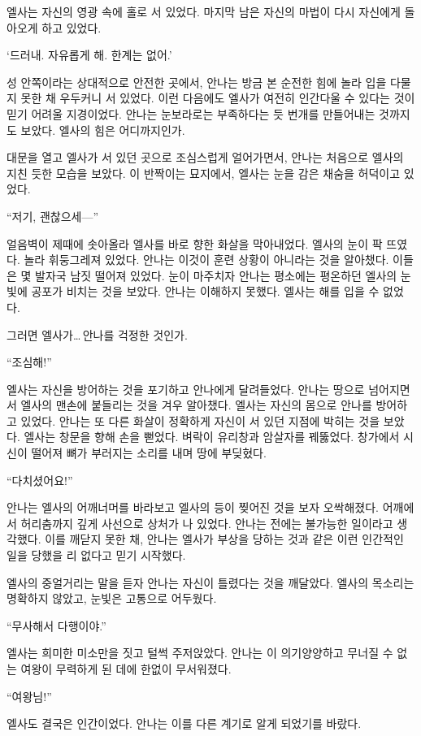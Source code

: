 엘사는 자신의 영광 속에 홀로 서 있었다. 마지막 남은 자신의 마법이 다시 자신에게 돌아오게 하고 있었다.

`드러내. 자유롭게 해. 한계는 없어.'

\textbreak

성 안쪽이라는 상대적으로 안전한 곳에서, 안나는 방금 본 순전한 힘에 놀라 입을 다물지 못한 채 우두커니 서 있었다. 이런 다음에도 엘사가 여전히 인간다울 수 있다는 것이 믿기 어려울 지경이었다. 안나는 눈보라로는 부족하다는 듯 번개를 만들어내는 것까지도 보았다. 엘사의 힘은 어디까지인가.

대문을 열고 엘사가 서 있던 곳으로 조심스럽게 얼어가면서, 안나는 처음으로 엘사의 지친 듯한 모습을 보았다. 이 반짝이는 묘지에서, 엘사는 눈을 감은 채숨을 허덕이고 있었다.

``저기, 괜찮으세—''

얼음벽이 제때에 솟아올라 엘사를 바로 향한 화살을 막아내었다. 엘사의 눈이 팍 뜨였다. 놀라 휘둥그레져 있었다. 안나는 이것이 훈련 상황이 아니라는 것을 알아챘다. 이들은 몇 발자국 남짓 떨어져 있었다. 눈이 마주치자 안나는 평소에는 평온하던 엘사의 눈빛에 공포가 비치는 것을 보았다. 안나는 이해하지 못했다. 엘사는 해를 입을 수 없었다.

그러면 엘사가\ldots\,안나를 걱정한 것인가.

``조심해!''

엘사는 자신을 방어하는 것을 포기하고 안나에게 달려들었다. 안나는 땅으로 넘어지면서 엘사의 맨손에 붙들리는 것을 겨우 알아챘다. 엘사는 자신의 몸으로 안나를 방어하고 있었다. 안나는 또 다른 화살이 정확하게 자신이 서 있던 지점에 박히는 것을 보았다. 엘사는 창문을 향해 손을 뻗었다. 벼락이 유리창과 암살자를 꿰뚫었다. 창가에서 시신이 떨어져 뼈가 부러지는 소리를 내며 땅에 부딪혔다.

``다치셨어요!''

안나는 엘사의 어깨너머를 바라보고 엘사의 등이 찢어진 것을 보자 오싹해졌다. 어깨에서 허리춤까지 깊게 사선으로 상처가 나 있었다. 안나는 전에는 불가능한 일이라고 생각했다. 이를 깨닫지 못한 채, 안나는 엘사가 부상을 당하는 것과 같은 이런 인간적인 일을 당했을 리 없다고 믿기 시작했다.

엘사의 중얼거리는 말을 듣자 안나는 자신이 틀렸다는 것을 깨달았다. 엘사의 목소리는 명확하지 않았고, 눈빛은 고통으로 어두웠다.

``무사해서 다행이야.''

엘사는 희미한 미소만을 짓고 털썩 주저앉았다. 안나는 이 의기양양하고 무너질 수 없는 여왕이 무력하게 된 데에 한없이 무서워졌다.

``여왕님!''

엘사도 결국은 인간이었다. 안나는 이를 다른 계기로 알게 되었기를 바랐다.

